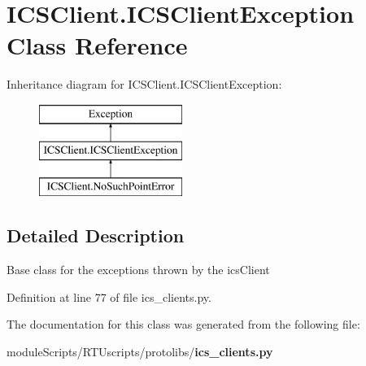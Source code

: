\section{I\+C\+S\+Client.\+I\+C\+S\+Client\+Exception Class Reference}
\label{classprotolibs_1_1ics__clients_1_1_i_c_s_client_1_1_i_c_s_client_exception}
Inheritance diagram for I\+C\+S\+Client.\+I\+C\+S\+Client\+Exception\+:\begin{figure}[H]
\begin{center}
\leavevmode
\includegraphics[height=3.000000cm]{classprotolibs_1_1ics__clients_1_1_i_c_s_client_1_1_i_c_s_client_exception}
\end{center}
\end{figure}


\subsection{Detailed Description}
\begin{DoxyVerb}Base class for the exceptions thrown by the icsClient\end{DoxyVerb}
 

Definition at line 77 of file ics\+\_\+clients.\+py.



The documentation for this class was generated from the following file\+:\begin{DoxyCompactItemize}
\item 
module\+Scripts/\+R\+T\+Uscripts/protolibs/{\bf ics\+\_\+clients.\+py}\end{DoxyCompactItemize}
